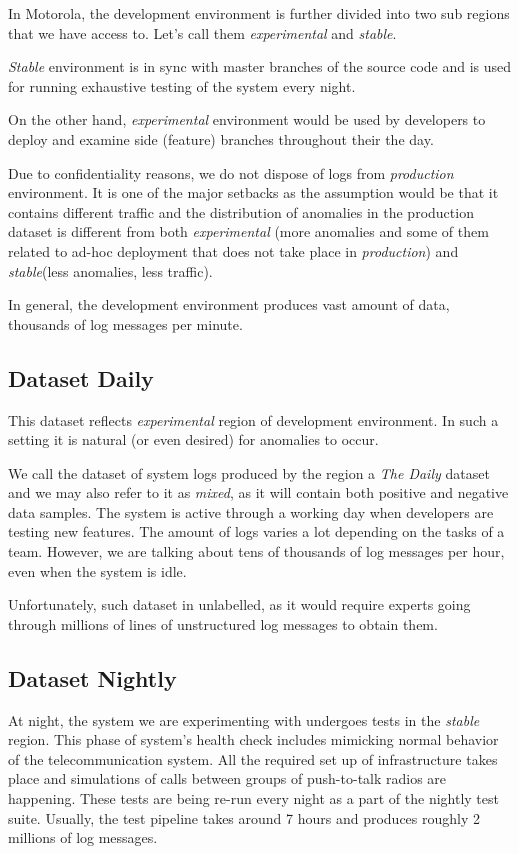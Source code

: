In Motorola, the development environment is further divided into two sub regions that we have access to. 
Let's call them \textit{experimental} and \textit{stable}. 

\textit{Stable} environment is in sync with master branches of the source code and is used for running exhaustive testing of the system every night. 

On the other hand, \textit{experimental} environment would be used by developers to deploy and examine side (feature) branches throughout their the day.

Due to confidentiality reasons, we do not dispose of logs from \textit{production} environment. It is one of the major setbacks as the assumption would be that it contains different traffic and the distribution of anomalies in the production dataset is different from both \textit{experimental} (more anomalies and some of them related to ad-hoc deployment that does not take place in \textit{production}) and \textit{stable}(less anomalies, less traffic).

In general, the development environment produces vast amount of data, thousands of log messages per minute.

\subsection{Dataset Daily} 
This dataset reflects \textit{experimental} region of development environment. In such a setting it is natural (or even desired) for anomalies to occur.

We call the dataset of system logs produced by the region a \textit{The Daily} dataset and we may also refer to it as \textit{mixed}, as it will contain both positive and negative data samples. 
The system is active through a working day when developers are testing new features. The amount of logs varies a lot depending on the tasks of a team. 
However, we are talking about tens of thousands of log messages per hour, even when the system is idle.

Unfortunately, such dataset in unlabelled, as it would require experts going through millions of lines of unstructured log messages to obtain them.

\subsection{Dataset Nightly}
At night, the system we are experimenting with undergoes tests in the \textit{stable} region. This phase of system's health check includes mimicking normal behavior of the telecommunication system. All the required set up of infrastructure takes place and simulations of calls between groups of push-to-talk radios are happening. 
These tests are being re-run every night as a part of the nightly test suite. 
Usually, the test pipeline takes around 7 hours and produces roughly 2 millions of log messages.

